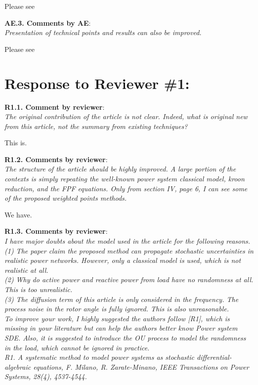 \documentclass[12pt,onecolumn]{IEEEtran}
\newcommand{\blue}{\color{blue}}
\def\spacingset#1{\def\baselinestretch{#1}\small\normalsize}
\newcommand{\nib}{\noindent  {\bf Response:} }
\begin{document}
{\nib {\blue Please see }}


\noindent
{\bf AE.3. Comments by AE}:\\
{\em Presentation of technical points and results can also be improved.}

{\nib {\blue Please see }}




\newpage
\spacingset{1}

\section*{\large \bf Response to Reviewer \#1:}


\noindent
{\bf R1.1. Comment by reviewer}:\\
{\em The original contribution of the article is not clear.  Indeed, what is original new from this article, not the summary from existing techniques?}


{\nib {\blue This is. 
}}



\noindent
{\bf R1.2. Comments by reviewer}:\\
{\em The structure of the article should be highly improved. A large portion of the contexts is simply repeating the well-known power system classical model, kroon reduction, and the FPF equations.  Only from section IV, page 6, I can see some of the proposed weighted points methods.}


{\nib{ \blue We have.}}


\noindent
{\bf R1.3. Comments by reviewer}:\\
{\em I have major doubts about the model used in the article for the following reasons.\\
(1)     The paper claim the proposed method can propagate stochastic uncertainties in realistic power networks. However, only a classical model is used, which is not realistic at all.\\
(2)     Why do active power and reactive power from load have no randomness at all. This is too unrealistic.\\
(3)     The diffusion term of this article is only considered in the frequency. The process noise in the rotor angle is fully ignored. This is also unreasonable.\\
To improve your work, I highly suggested the authors follow [R1], which is missing in your literature but can help the authors better know Power system SDE.  Also, it is suggested to introduce the OU process to model the randomness in the load, which cannot be ignored in practice.\\
R1. A systematic method to model power systems as stochastic differential-algebraic equations, F. Milano, R. Zarate-Minano, IEEE Transactions on Power Systems, 28(4), 4537-4544.}
\end{document}
